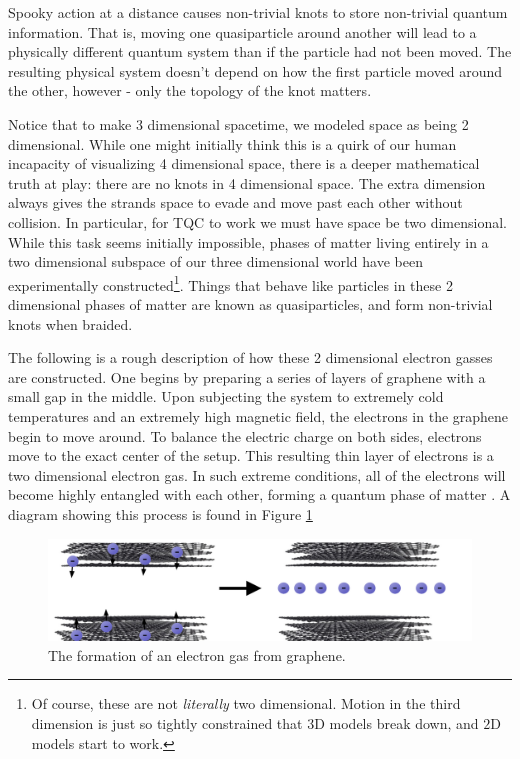 \documentclass{article}
\theoremstyle{definition}
\numberwithin{figure}{section}
\begin{document}
Spooky action at a distance causes non-trivial knots to store non-trivial quantum information. That is, moving one quasiparticle around another will lead to a physically different quantum system than if the particle had not been moved. The resulting physical system doesn't depend on how the first particle moved around the other, however - only the topology of the knot matters.

Notice that to make 3 dimensional spacetime, we modeled space as being 2 dimensional. While one might initially think this is a quirk of our human incapacity of visualizing 4 dimensional space, there is a deeper mathematical truth at play: there are no knots in 4 dimensional space. The extra dimension always gives the strands space to evade and move past each other without collision. In particular, for TQC to work we must have space be two dimensional. While this task seems initially impossible, phases of matter living entirely in a two dimensional subspace of our three dimensional world have been experimentally constructed\footnote{Of course, these are not \textit{literally} two dimensional. Motion in the third dimension is just so tightly constrained that $3$D models break down, and $2$D models start to work.}. Things that behave like particles in these 2 dimensional phases of matter are known as quasiparticles, and form non-trivial knots when braided.

The following is a rough description of how these 2 dimensional electron gasses are constructed. One begins by preparing a series of layers of graphene with a small gap in the middle. Upon subjecting the system to extremely cold temperatures and an extremely high magnetic field, the electrons in the graphene begin to move around. To balance the electric charge on both sides, electrons move to the exact center of the setup. This resulting thin layer of electrons is a two dimensional electron gas. In such extreme conditions, all of the electrons will become highly entangled with each other, forming a quantum phase of matter \cite{yang2021experimental}. A diagram showing this process is found in Figure \ref{fig:spin-liquid}

\begin{figure}
\begin{center}
\includegraphics[scale=0.30]{spin-liquid}
\caption{The formation of an electron gas from graphene.}
\label{fig:spin-liquid}
\end{center}
\end{figure}
\end{document}
